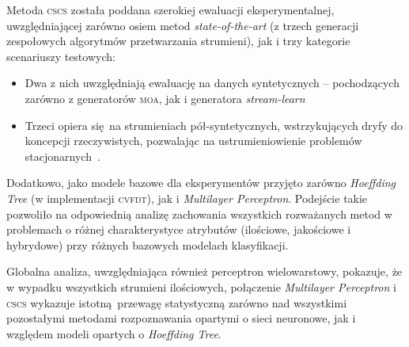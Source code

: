Metoda \textsc{cscs} została poddana szerokiej ewaluacji eksperymentalnej, uwzględniającej zarówno osiem metod \emph{state-of-the-art} (z trzech generacji zespołowych algorytmów przetwarzania strumieni), jak i trzy kategorie scenariuszy testowych: 

\begin{itemize}
	\item Dwa z nich uwzględniają ewaluację na danych syntetycznych -- pochodzących zarówno z generatorów \textsc{moa}, jak i generatora \emph{stream-learn}
	\item Trzeci opiera się na strumieniach pół-syntetycznych, wstrzykujących dryfy do koncepcji rzeczywistych, pozwalając na ustrumieniowienie problemów stacjonarnych~.	
\end{itemize}

Dodatkowo, jako modele bazowe dla eksperymentów przyjęto zarówno \emph{Hoeffding Tree} (w implementacji \textsc{cvfdt}), jak i \emph{Multilayer Perceptron}. Podejście takie pozwoliło na odpowiednią analizę zachowania wszystkich rozważanych metod w problemach o różnej charakterystyce atrybutów (ilościowe, jakościowe i hybrydowe) przy różnych bazowych modelach klasyfikacji.


Globalna analiza, uwzględniająca również perceptron wielowarstowy, pokazuje, że w wypadku wszystkich strumieni ilościowych, połączenie \emph{Multilayer Perceptron} i \textsc{cscs} wykazuje istotną przewagę statystyczną zarówno nad wszystkimi pozostałymi metodami rozpoznawania opartymi o sieci neuronowe, jak i względem modeli opartych o \emph{Hoeffding Tree}.


